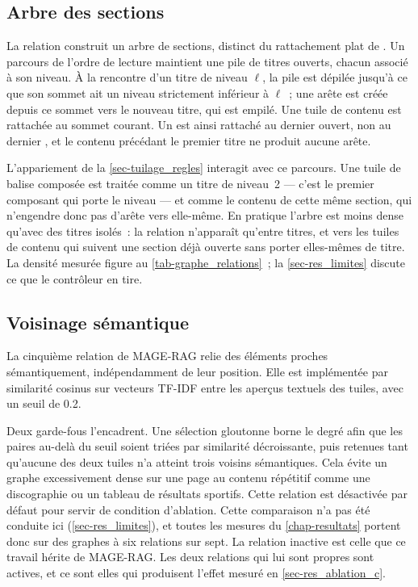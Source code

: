 \subsection{Arbre des sections}
\label{sec-graphe_hierarchie}

La relation  construit un arbre de sections, distinct du
rattachement plat de . Un parcours de l'ordre de lecture maintient
une pile de titres ouverts, chacun associé à son niveau. À la rencontre d'un titre
de niveau $\ell$, la pile est dépilée jusqu'à ce que son sommet ait un niveau
strictement inférieur à $\ell$~; une arête est créée depuis ce sommet vers le
nouveau titre, qui est empilé. Une tuile de contenu est rattachée au sommet
courant. Un  est ainsi rattaché au dernier  ouvert, non au
dernier , et le contenu précédant le premier titre ne produit aucune
arête.

L'appariement de la \cref{sec-tuilage_regles} interagit avec ce parcours. Une tuile
de balise composée  est traitée comme un titre de niveau~2 --- c'est le
premier composant qui porte le niveau --- et comme le contenu de cette même
section, qui n'engendre donc pas d'arête vers elle-même. En pratique l'arbre est
moins dense qu'avec des titres isolés~: la relation n'apparaît qu'entre titres, et
vers les tuiles de contenu qui suivent une section déjà ouverte sans porter
elles-mêmes de titre. La densité mesurée figure au
\cref{tab-graphe_relations}~; la \cref{sec-res_limites} discute ce que le
contrôleur en tire.

\subsection{Voisinage sémantique}
\label{sec-graphe_semantique}
 
La cinquième relation de MAGE-RAG relie des éléments proches sémantiquement,
indépendamment de leur position. Elle est implémentée par similarité cosinus sur
vecteurs TF-IDF entre les aperçus textuels des tuiles, avec un seuil de
\num{0.2}.
 
Deux garde-fous l'encadrent. Une sélection gloutonne borne le degré afin que les paires
au-delà du seuil soient triées par similarité décroissante, puis retenues tant
qu'aucune des deux tuiles n'a atteint trois voisins sémantiques. Cela évite un
graphe excessivement dense sur une page au contenu répétitif comme une
discographie ou un tableau de résultats sportifs. Cette relation est désactivée par défaut pour servir de condition d'ablation. Cette comparaison n'a pas été conduite ici
(\cref{sec-res_limites}), et toutes les mesures du \cref{chap-resultats} portent
donc sur des graphes à six relations sur sept. La relation inactive est celle
que ce travail hérite de MAGE-RAG. Les deux relations qui lui sont propres sont
actives, et ce sont elles qui produisent l'effet mesuré en
\cref{sec-res_ablation_c}.
 
